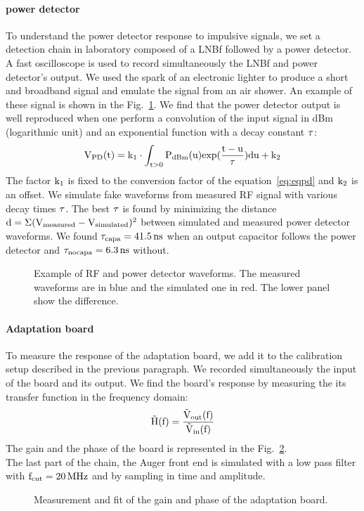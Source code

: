 \paragraph{power detector}
To understand the power detector response to impulsive signals, we set  a detection chain in laboratory composed  of a LNBf  followed by a  power detector. A fast oscilloscope is  used to record simultaneously the  LNBf and power
detector's  output. We  used the  spark  of an  electronic lighter  to
produce a short and broadband  signal and emulate  the signal from an  air shower. An example of these signal is shown in the Fig.~\ref{fig:powerdetsim}. We  find that the power detector output is well reproduced when one perform  a convolution of the input signal in dBm (logarithmic unit) and an exponential function with a decay constant $\rm \tau$:
\begin{equation}
  \rm V_{PD}(t) = k_{1}\cdot \int_{t>0}P_{dBm}(u)exp(\frac{t-u}{\tau})du + k_{2}
  \label{eq:convolution}
\end{equation}
The factor    $\rm   k_{1}$  is fixed to   the   conversion    factor   of   the
equation~\ref{eq:eqpd} and $\rm   k_{2}$ is an offset. We simulate fake waveforms from measured RF signal with various decay times  $\rm \tau$. The best $\rm \tau$ is found by minimizing the distance $\rm d = \Sigma (V_{measured} - V_{simulated})^2$ between simulated and measured power detector waveforms.  We found $\rm \tau_{capa}  = \unit[41.5]{ns}$ when an  output capacitor follows the power detector and $\rm \tau_{nocapa} = \unit[6.3]{ns}$ without. 
\begin{figure}[!ht]
 \centering
 \hspace*{-3ex}
 \caption{Example  of RF  and power  detector waveforms.  The measured
   waveforms are in blue and the simulated one in red. The lower panel
   show the difference.}
 \label{fig:powerdetsim}
\end{figure}
\paragraph{Adaptation board}
To measure the response of  the adaptation board, we add it to the calibration setup described in the previous paragraph.  We  recorded simultaneously the  input of the  board and  its  output. We  find the  board's response  by measuring the its transfer function in the frequency domain:
\begin{equation}
  \rm \tilde{H}(f) = \frac{\tilde{V}_{out}(f)}{\tilde{V}_{in}(f)}
\end{equation}
The  gain and the phase of the board is  represented  in  the  Fig.~\ref{fig:board}. \\The last part of  the chain, the Auger front  end is simulated with  a low pass filter with $\rm f_{cut} = \unit[20]{MHz}$ and by sampling in time and amplitude.
\begin{figure}[!ht]
 \centering
 \hspace*{-3ex}
 \caption{Measurement and fit of the gain and phase of the adaptation board.}
 \label{fig:board}
\end{figure}

